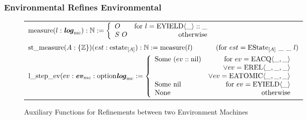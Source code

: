\clearpage

\subsubsection{Environmental Refines Environmental}
\label{subsubsec:env-refines-emv}

\begin{figure}


\begin{tabular}{l}
$
   {\mathrm{measure}} (l : {\mathrm{\textbf{\textit{log}}}_{\mathrm{mc}}})  : {\mathbb{N}} :=
     \left\{\begin{array}{lr}
        O & \text{for }  l = {{{{\mathrm{EYIELD}}\langle{\_}\rangle}}::{\_}} \\
        S \ O & \text{otherwise}\\
        \end{array} \right.$ \\
$ \mcstatemeasurekwd (A : \set{\ztype}) (est : \envstatekwd_{[A]}) : \nattype := \mcmeasurenoeq{l} \ \ \ \ \ \ \ \ \ \ (\text{for } est = \envstate{A}{\_}{\_}{l}) $\\
$ {\mathrm{l}\_\mathrm{step}\_\mathrm{ev}} (ev : {\mathrm{\textbf{\textit{ev}}}_{mc}} : \mathrm{option} {\mathrm{\textbf{\textit{log}}}_{\mathrm{mc}}} := 
     \left\{\begin{array}{lr}
        \mathrm{Some} \ ({{ev}::{{\mathrm{nil}}}}) & \text{for }  ev = {{\mathrm{EACQ}}\langle{\_}, {\_}\rangle} \\
                                        & \vee  ev= {{\mathrm{EREL}}\langle{\_}, {\_}, {\_}\rangle} \\
                                        & \vee ev= {{\mathrm{EATOMIC}}\langle{\_}, {\_}, {\_}\rangle} \\
        \mathrm{Some} \ {\mathrm{nil}} & \text{for }  ev = {{\mathrm{EYIELD}}\langle{\_}\rangle} \\
	   \mathrm{None} & \text{otherwise}\\
        \end{array} \right. $ \\
\end{tabular}        
%  
%


\caption{Auxiliary Functions for Refinements between two Environment Machines}
\label{fig:aux-functions-for-env-refines-env}
\end{figure}



